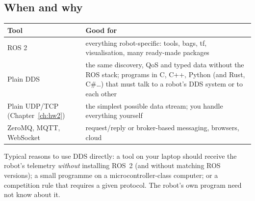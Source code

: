 \subsection*{When and why}
\begin{center}
\renewcommand{\arraystretch}{1.25}
\begin{tabular}{p{3.6cm}p{9.0cm}}
\textbf{Tool} & \textbf{Good for}\\ \hline
ROS 2 & everything robot-specific: tools, bags, tf, visualisation, many ready-made packages\\
Plain DDS & the same discovery, QoS and typed data without the ROS stack; programs in C, C++, Python (and Rust, C\#\ldots) that must talk to a robot's DDS system or to each other\\
Plain UDP/TCP (Chapter~\ref{ch:hw2}) & the simplest possible data stream; you handle everything yourself\\
ZeroMQ, MQTT, WebSocket & request/reply or broker-based messaging, browsers, cloud\\
\end{tabular}
\end{center}
Typical reasons to use DDS directly: a tool on your laptop should receive the robot's telemetry \emph{without} installing ROS~2 (and without matching ROS versions); a small programme on a microcontroller-class computer; or a competition rule that requires a given protocol. The robot's own program need not know about it.

